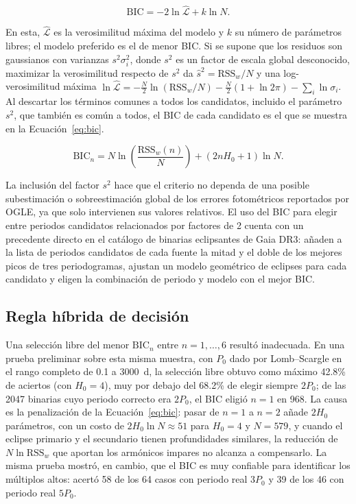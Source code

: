 \documentclass[12pt,letterpaper,oneside]{book}
\begin{document}
\begin{equation}
	\mathrm{BIC} = -2\ln\hat{\mathcal{L}} + k\ln N.
	\label{eq:bic-general}
\end{equation}

En esta, $\hat{\mathcal{L}}$ es la verosimilitud m\'axima del modelo y $k$ su n\'umero de par\'ametros libres; el modelo preferido es el de menor BIC. Si se supone que los residuos son gaussianos con varianzas $s^2\sigma_i^2$, donde $s^2$ es un factor de escala global desconocido, maximizar la verosimilitud respecto de $s^2$ da $\hat s^2=\mathrm{RSS}_w/N$ y una log-verosimilitud m\'axima $\ln\hat{\mathcal{L}}=-\tfrac{N}{2}\ln(\mathrm{RSS}_w/N)-\tfrac{N}{2}(1+\ln2\pi)-\sum_i\ln\sigma_i$. Al descartar los t\'erminos comunes a todos los candidatos, incluido el par\'ametro $s^2$, que tambi\'en es com\'un a todos, el BIC de cada candidato es el que se muestra en la Ecuaci\'on~\eqref{eq:bic}.

\begin{equation}
	\mathrm{BIC}_n = N\ln\left(\frac{\mathrm{RSS}_w(n)}{N}\right) + (2nH_0+1)\ln N.
	\label{eq:bic}
\end{equation}

La inclusi\'on del factor $s^2$ hace que el criterio no dependa de una posible subestimaci\'on o sobreestimaci\'on global de los errores fotom\'etricos reportados por OGLE, ya que solo intervienen sus valores relativos. El uso del BIC para elegir entre periodos candidatos relacionados por factores de 2 cuenta con un precedente directo en el cat\'alogo de binarias eclipsantes de Gaia DR3: \citet{Mowlavi2023} a\~naden a la lista de periodos candidatos de cada fuente la mitad y el doble de los mejores picos de tres periodogramas, ajustan un modelo geom\'etrico de eclipses para cada candidato y eligen la combinaci\'on de periodo y modelo con el mejor BIC.

\subsection{Regla h\'ibrida de decisi\'on}

Una selecci\'on libre del menor $\mathrm{BIC}_n$ entre $n=1,\dots,6$ result\'o inadecuada. En una prueba preliminar sobre esta misma muestra, con $P_0$ dado por Lomb--Scargle en el rango completo de 0.1 a 3000~d, la selecci\'on libre obtuvo como m\'aximo 42.8\% de aciertos (con $H_0=4$), muy por debajo del 68.2\% de elegir siempre $2P_0$; de las 2047 binarias cuyo periodo correcto era $2P_0$, el BIC eligi\'o $n=1$ en 968. La causa es la penalizaci\'on de la Ecuaci\'on~\eqref{eq:bic}: pasar de $n=1$ a $n=2$ a\~nade $2H_0$ par\'ametros, con un costo de $2H_0\ln N\approx51$ para $H_0=4$ y $N=579$, y cuando el eclipse primario y el secundario tienen profundidades similares, la reducci\'on de $N\ln\mathrm{RSS}_w$ que aportan los arm\'onicos impares no alcanza a compensarlo. La misma prueba mostr\'o, en cambio, que el BIC es muy confiable para identificar los m\'ultiplos altos: acert\'o 58 de los 64 casos con periodo real $3P_0$ y 39 de los 46 con periodo real $5P_0$.
\end{document}
